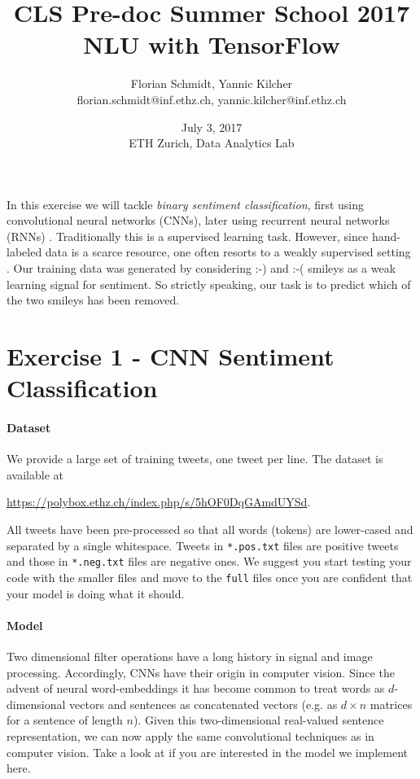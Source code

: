 \documentclass{article}
\title{CLS Pre-doc Summer School 2017\\NLU with TensorFlow }
\author{Florian Schmidt, Yannic Kilcher\\\small florian.schmidt@inf.ethz.ch, yannic.kilcher@inf.ethz.ch}
\date{July 3, 2017\\\normalsize ETH Zurich, Data Analytics Lab}
\begin{document}
\maketitle
In this exercise we will tackle \textit{binary sentiment classification}, first using convolutional neural networks (CNNs), later using recurrent neural networks (RNNs) . Traditionally this is a supervised learning task. However, since hand-labeled data is a scarce resource, one often resorts to a weakly supervised setting \cite{kim2014convolutional}. Our training data was generated by considering :-) and :-( smileys as a weak learning signal for sentiment. So strictly speaking, our task is to predict which of the two smileys has been removed.

\section*{Exercise 1 - CNN Sentiment Classification}


\paragraph{Dataset} We provide a large set of training tweets, one tweet per line. The dataset is available at
\begin{center}
\url{https://polybox.ethz.ch/index.php/s/5hOF0DqGAmdUYSd}.
\end{center} 
All tweets have been pre-processed so that all words (tokens) are lower-cased and separated by a single whitespace. Tweets in \texttt{*.pos.txt} files are positive tweets and those in \texttt{*.neg.txt} files are negative ones. We suggest you start testing your code with the smaller files and move to the \texttt{full} files once you are confident that your model is doing what it should.\\



\paragraph{Model}
Two dimensional filter operations have a long history in signal and image processing. Accordingly, CNNs have their origin in computer vision. Since the advent of neural word-embeddings \cite{turian2010} \cite{mikolovSCCD13} \cite{glove} it has become common to treat words as $d$-dimensional vectors and sentences as concatenated vectors (e.g. as $d\times n$ matrices for a sentence of length $n$). Given this two-dimensional real-valued sentence representation, we can now apply the same convolutional techniques as in computer vision. Take a look at  \cite{kim2014convolutional} \cite{severyn15} \cite{deriuLLSMCHJ17} if you are interested in the model we implement here.\\
\end{document}
